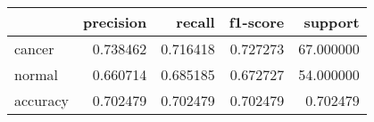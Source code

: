 \begin{tabular}{lrrrr}
\toprule
 & precision & recall & f1-score & support \\
\midrule
cancer & 0.738462 & 0.716418 & 0.727273 & 67.000000 \\
normal & 0.660714 & 0.685185 & 0.672727 & 54.000000 \\
accuracy & 0.702479 & 0.702479 & 0.702479 & 0.702479 \\
\bottomrule
\end{tabular}

